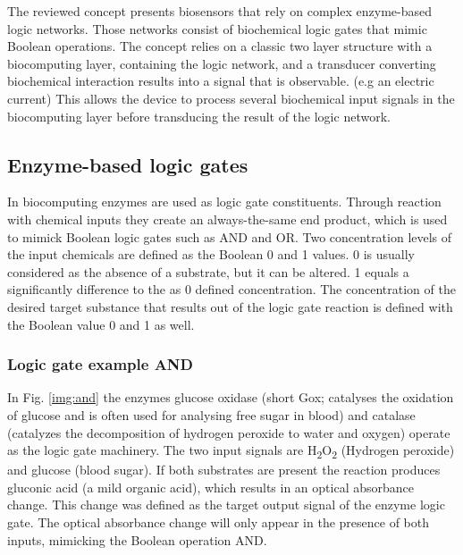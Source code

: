 \documentclass[runningheads]{llncs}
\begin{document}
The reviewed concept presents biosensors that rely on complex enzyme-based logic networks. Those networks consist of biochemical logic gates that mimic Boolean operations. The concept relies on a classic two layer structure with a biocomputing layer, containing the logic network, and a transducer converting biochemical interaction results into a signal that is observable. (e.g an electric current) This allows the device to process several biochemical input signals in the biocomputing layer before transducing the result of the logic network. \cite{application review}\cite{original}\cite{state of the art}


\subsection{Enzyme-based logic gates}		
		In biocomputing enzymes are used as logic gate constituents. Through reaction with chemical inputs they create an always-the-same end product, which is used to mimick Boolean logic gates such as AND and OR. Two concentration levels of the input chemicals are defined as the Boolean 0 and 1 values. 0 is usually considered as the absence of a substrate, but it can be altered. 1 equals a significantly difference to the as 0 defined concentration. 
		The concentration of the desired target substance that results out of the logic gate reaction is defined with the Boolean value 0 and 1 as well. \cite{original} \cite{haupt}\\
	
		\subsubsection{Logic gate example AND}
		In Fig. \ref{img:and} the enzymes glucose oxidase (short Gox; catalyses the oxidation of glucose and is often used for analysing free sugar in blood) and catalase (catalyzes the decomposition of hydrogen peroxide to water and oxygen) operate as the logic gate machinery. The two input signals are H\textsubscript{2}O\textsubscript{2} (Hydrogen peroxide) and glucose (blood sugar). If both substrates are present the reaction produces gluconic acid (a mild organic acid), which results in an optical absorbance change. This change was defined as the target output signal of the enzyme logic gate. The optical absorbance change will only appear in the presence of both inputs, mimicking the Boolean operation AND. \cite{original}\cite{haupt}\cite{chemie}
		
\end{document}
